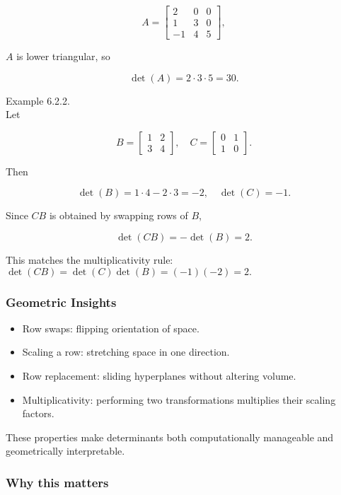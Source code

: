 \documentclass[
  12pt,
  a4paper,
]{article}
\begin{document}
\[A = \begin{bmatrix} 2 & 0 & 0 \\ 1 & 3 & 0 \\ -1 & 4 & 5 \end{bmatrix},\]

\(A\) is lower triangular, so

\[\det(A) = 2 \cdot 3 \cdot 5 = 30.\]

Example 6.2.2.\\
Let

\[B = \begin{bmatrix} 1 & 2 \\ 3 & 4 \end{bmatrix}, \quad
C = \begin{bmatrix} 0 & 1 \\ 1 & 0 \end{bmatrix}.\]

Then

\[\det(B) = 1\cdot 4 - 2\cdot 3 = -2, \quad \det(C) = -1.\]

Since \(CB\) is obtained by swapping rows of \(B\),

\[\det(CB) = -\det(B) = 2.\]

This matches the multiplicativity rule:
\(\det(CB) = \det(C)\det(B) = (-1)(-2) = 2.\)

\subsubsection{Geometric Insights}\label{geometric-insights}

\begin{itemize}
\item
  Row swaps: flipping orientation of space.
\item
  Scaling a row: stretching space in one direction.
\item
  Row replacement: sliding hyperplanes without altering volume.
\item
  Multiplicativity: performing two transformations multiplies their
  scaling factors.
\end{itemize}

These properties make determinants both computationally manageable and
geometrically interpretable.

\subsubsection{Why this matters}\label{why-this-matters-21}
\end{document}
